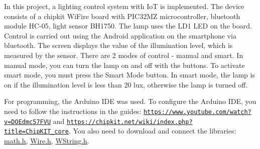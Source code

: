 In this project, a lighting control system with IoT is implemented. The device consists of a chipkit Wi\+Fire board with P\+I\+C32\+MZ microcontroller, bluetooth module H\+C-\/05, light sensor B\+H1750. The lamp uses the L\+D1 L\+ED on the board. Control is carried out using the Android application on the smartphone via bluetooth. The screen displays the value of the illumination level, which is measured by the sensor. There are 2 modes of control -\/ manual and smart. In manual mode, you can turn the lamp on and off with the buttons. To activate smart mode, you must press the Smart Mode button. In smart mode, the lamp is on if the illumination level is less than 20 lux, otherwise the lamp is turned off.

For programming, the Arduino I\+DE was used. To configure the Arduino I\+DE, you need to follow the instructions in the guides\+: \href{https://www.youtube.com/watch?v=DOEdmc57FVU}{\tt https\+://www.\+youtube.\+com/watch?v=\+D\+O\+Edmc57\+F\+VU} and \href{https://chipkit.net/wiki/index.php?title=ChipKIT_core}{\tt https\+://chipkit.\+net/wiki/index.\+php?title=\+Chip\+K\+I\+T\+\_\+core}. You also need to download and connect the libraries\+: \hyperlink{math_8h}{math.\+h}, \hyperlink{_wire_8h}{Wire.\+h}, \hyperlink{_w_string_8h}{W\+String.\+h}. 